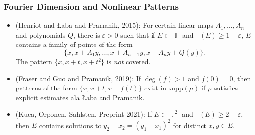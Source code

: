 \documentclass[handout,usenames,dvipsnames]{beamer}
\DeclareMathOperator{\TT}{\mathbb{T}}
\DeclareMathOperator{\fordim}{\text{dim}_{\mathbb{F}}}
\DeclareMathOperator{\hausdim}{\text{dim}_{\mathbb{H}}}
\begin{document}
\begin{frame}
    \frametitle{Fourier Dimension and Nonlinear Patterns}

    \begin{itemize}
        \pause
        \item (Henriot and Łaba and Pramanik, 2015): For certain linear maps $A_1,\dots,A_n$ and polynomials $Q$, there is $\varepsilon > 0$ such that if $E \subset \TT$ and $\fordim(E) \geq 1 - \varepsilon$, $E$ contains a family of points of the form
        \[ \{ x, x + A_1y, \dots, x + A_{n-1}y, x + A_ny + Q(y) \}. \]
        The pattern $\{ x, x + t, x + t^2 \}$ is \emph{not} covered.

        \pause
        \item (Fraser and Guo and Pramanik, 2019): If $\deg(f) > 1$ and $f(0) = 0$, then patterns of the form $\{ x, x + t, x + f(t) \}$ exist in $\text{supp}(\mu)$ if $\mu$ satisfies explicit estimates ala Łaba and Pramanik.

        \pause
        \item (Kuca, Orponen, Sahlsten, Preprint 2021): If $E \subset \TT^2$ and $\hausdim(E) \geq 2 - \varepsilon$, then $E$ contains solutions to $y_2 - x_2 = (y_1 - x_1)^2$ for distinct $x,y \in E$.
    \end{itemize}
\end{frame}
\end{document}
